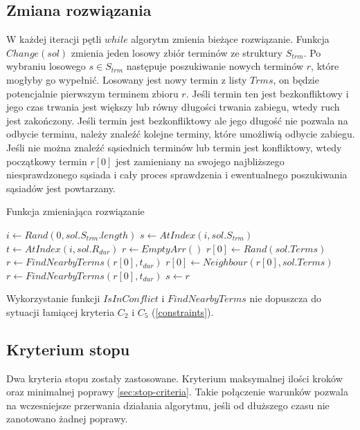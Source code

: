 \subsection{Zmiana rozwiązania}
W każdej iteracji pętli $while$ algorytm zmienia bieżące rozwiązanie. Funkcja
$Change(sol)$ zmienia jeden losowy zbiór terminów ze struktury $S_{trm}$.
Po wybraniu losowego $s \in S_{trm}$ następuje poszukiwanie nowych terminów $r$,
które mogłyby go wypełnić. Losowany jest nowy termin z listy $Trms$, on będzie
potencjalnie pierwszym terminem zbioru $r$. Jeśli termin ten jest bezkonfliktowy
i jego czas trwania jest większy lub równy długości trwania zabiegu, wtedy ruch
jest zakończony. Jeśli termin jest bezkonfliktowy ale jego długość nie pozwala
na odbycie terminu, należy znaleźć kolejne terminy, które umożliwią odbycie
zabiegu. Jeśli nie można znaleźć sąsiednich terminów lub termin jest
konfliktowy, wtedy początkowy termin $r[0]$ jest zamieniany na swojego
najbliższego niesprawdzonego sąsiada i cały proces sprawdzenia i ewentualnego
poszukiwania sąsiadów jest powtarzany.

\begin{algorithm}
	\caption{Funkcja zmieniająca rozwiązanie}\label{fn-change}
\begin{algorithmic}[1]
\State $i \gets Rand(0,sol.S_{trm}.length)$
\State $s \gets AtIndex(i,sol.S_{trm})$
\State $t \gets AtIndex(i,sol.R_{dur})$
\State $r \gets EmptyArr()$
\State $r[0] \gets Rand(sol.Terms)$
\State $r \gets FindNearbyTerms(r[0], t_{dur})$
\State $r[0] \gets Neighbour(r[0],sol.Terms)$
\State $r \gets FindNearbyTerms(r[0], t_{dur})$
\EndWhile
\State $s \gets r$
\EndProcedure
\end{algorithmic}
\end{algorithm}
Wykorzystanie funkcji $IsInConflict$ i $FindNearbyTerms$ nie dopuszcza do sytuacji łamiącej
kryteria $C_2$ i $C_5$ (\ref{constraints}).
\newpage
\subsection{Kryterium stopu}
Dwa kryteria stopu zostały zastosowane. Kryterium maksymalnej ilości kroków oraz
minimalnej poprawy \ref{sec:stop-criteria}. Takie
połączenie warunków pozwala na wczesniejsze przerwania działania algorytmu,
jeśli od dłuższego czasu nie zanotowano żadnej poprawy.

